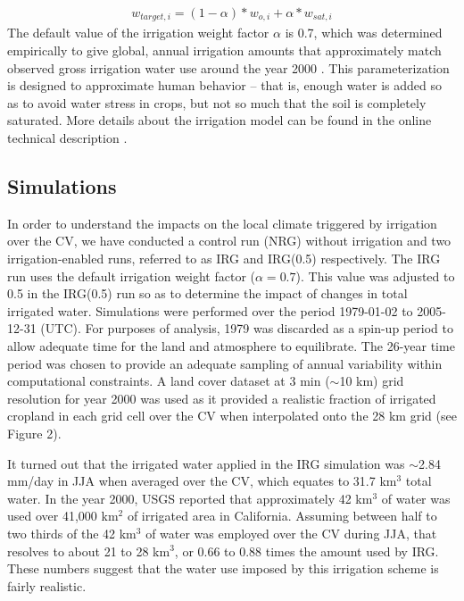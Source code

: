 \documentclass[draft,ms]{agutex}   %
\begin{document}
\begin{article}
\begin{align} \label{eq:TargetSoilMoisture}
w_{target,i} = (1-{\alpha})*w_{o,i} + {\alpha}*w_{sat,i}
\end{align} The default value of the irrigation weight factor $\alpha$ is 0.7, which was determined empirically to give global, annual irrigation amounts that approximately match observed gross irrigation water use around the year 2000 \citep{shiklomanov2000appraisal}. This parameterization is designed to approximate human behavior -- that is, enough water is added so as to avoid water stress in crops, but not so much that the soil is completely saturated. More details about the irrigation model can be found in the online technical description \citep{irrigationTechnicCLM}.

\subsection{Simulations}

In order to understand the impacts on the local climate triggered by irrigation over the CV, we have conducted a control run (NRG) without irrigation and two irrigation-enabled runs, referred to as IRG and IRG(0.5) respectively. The IRG run uses the default irrigation weight factor ($\alpha = 0.7$).  This value was adjusted to 0.5 in the IRG(0.5) run so as to determine the impact of changes in total irrigated water. Simulations were performed over the period 1979-01-02 to 2005-12-31 (UTC).  For purposes of analysis, 1979 was discarded as a spin-up period to allow adequate time for the land and atmosphere to equilibrate. The 26-year time period was chosen to provide an adequate sampling of annual variability within computational constraints. A land cover dataset at 3 min ($\sim$10 km) grid resolution for year 2000 was used as it provided a realistic fraction of irrigated cropland in each grid cell over the CV when interpolated onto the 28 km grid (see Figure 2). 

It turned out that the irrigated water applied in the IRG simulation was $\sim$2.84 mm/day in JJA when averaged over the CV, which equates to 31.7 km$^3$ total water. In the year 2000, USGS reported that approximately 42 km$^3$ of water was used over 41,000 km$^2$ of irrigated area in California. Assuming between half to two thirds of the 42 km$^3$ of water was employed over the CV during JJA, that resolves to about 21 to 28 km$^3$, or 0.66 to 0.88 times the amount used by IRG. These numbers suggest that the water use imposed by this irrigation scheme is fairly realistic.


\end{article}
\end{document}
